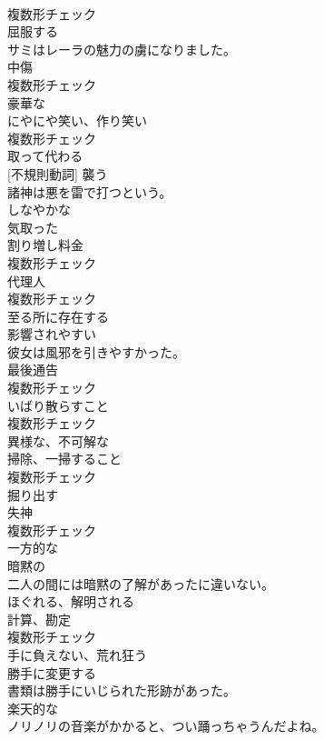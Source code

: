 \documentclass[8pt]{extreport}
\begin{document}
\begin{CJK}{UTF8}{min}
\\	複数形チェック
\\	[動詞]	屈服する	
\\	サミはレーラの魅力の虜になりました。	
\\	[名詞]	中傷	
\\	複数形チェック
\\	[形容詞]	豪華な	
\\	[名詞]	にやにや笑い、作り笑い	
\\	複数形チェック
\\	[動詞]	取って代わる	
\\	[動詞] [不規則動詞]	襲う	
\\	諸神は悪を雷で打つという。	
\\	[形容詞]	しなやかな	
\\	[形容詞]	気取った	
\\	[名詞]	割り増し料金	
\\	複数形チェック
\\	[名詞]	代理人	
\\	複数形チェック
\\	[形容詞]	至る所に存在する	
\\	[形容詞]	影響されやすい	
\\	彼女は風邪を引きやすかった。	
\\	[名詞]	最後通告	
\\	複数形チェック
\\	[名詞]	いばり散らすこと	
\\	複数形チェック
\\	[形容詞]	異様な、不可解な	
\\	[名詞]	掃除、一掃すること	
\\	複数形チェック
\\	[動詞]	掘り出す	
\\	[名詞]	失神	
\\	複数形チェック
\\	[形容詞]	一方的な	
\\	[形容詞]	暗黙の	
\\	二人の間には暗黙の了解があったに違いない。	
\\	[動詞]	ほぐれる、解明される	
\\	[名詞]	計算、勘定	
\\	複数形チェック
\\	[形容詞]	手に負えない、荒れ狂う	
\\	[動詞]	勝手に変更する	
\\	書類は勝手にいじられた形跡があった。	
\\	[名詞]	楽天的な	
\\	ノリノリの音楽がかかると、つい踊っちゃうんだよね。	

\end{CJK}
\end{document}
